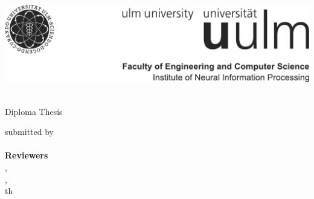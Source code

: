 \begin{titlepage}
    \begin{center}
        \includegraphics[width=\textwidth]{frontmatter/img/logowithfaculty}
    \end{center}

    \vspace{2.5cm}
    \begin{center}
    \Huge{\bfseries\thesistitle} \\
    \vspace{0.25cm}
    \Large{Diploma Thesis}

    \vspace{2.5cm}
    \Large{submitted by} \\
    \Large{\fullname} \\

    \vspace{2cm}
    \Large{\textbf{Reviewers}} \\
    \Large{\supervisorA, \supervisorAuni} \\
    \Large{\supervisorB, \supervisorBuni} \\


    \vspace{2cm}
    \Large{\thday{}th \thmonth{ }\thyear}

    \end{center}
\end{titlepage}
\restoregeometry
